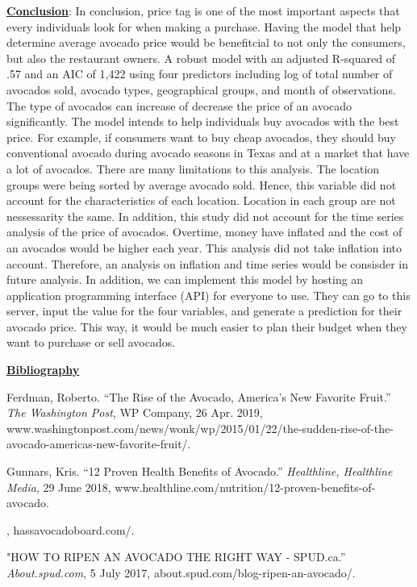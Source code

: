 \documentclass[11pt]{article}\usepackage[]{graphicx}\usepackage[]{color}
\begin{document}
\noindent\textbf{\underline{Conclusion}}: In conclusion, price tag is one of the most important aspects that every individuals look for when making a purchase. Having the model that help determine average avocado price would be benefitcial to not only the consumers, but also the restaurant owners. A robust model with an adjusted R-squared of .57 and an AIC of 1,422 using four predictors including log of total number of avocados sold, avocado types, geographical groups, and month of observations. The type of avocados can increase of decrease the price of an avocado significantly. The model intends to help individuals buy avocados with the best price. For example, if consumers want to buy cheap avocados, they should buy conventional avocado during avocado seasons in Texas and at a market that have a lot of avocados. There are many limitations to this analysis. The location groups were being sorted by average avocado sold. Hence, this variable did not account for the characteristics of each location. Location in each group are not nessessarity the same. In addition, this study did not account for the time series analysis of the price of avocados. Overtime, money have inflated and the cost of an avocados would be higher each year. This analysis did not take inflation into account. Therefore, an analysis on inflation and time series would be consisder in future analysis. In addition, we can implement this model by hosting an application programming interface (API) for everyone to use. They can go to this server, input the value for the four variables, and generate a prediction for their avocado price. This way, it would be much easier to plan their budget when they want to purchase or sell avocados.      
\hfill \break


\clearpage
\noindent\textbf{\underline{Bibliography}}
\hfill \break

\noindent [1] Ferdman, Roberto. “The Rise of the Avocado, America's New Favorite Fruit.” {\em The Washington Post}, WP Company, 26 Apr. 2019, www.washingtonpost.com/news/wonk/wp/2015/01/22/the-sudden-rise-of-the-avocado-americas-new-favorite-fruit/. 

\noindent [2] Gunnars, Kris. “12 Proven Health Benefits of Avocado.” {\em Healthline, Healthline Media}, 29 June 2018, www.healthline.com/nutrition/12-proven-benefits-of-avocado. 

, hassavocadoboard.com/. 

\noindent [4] "HOW TO RIPEN AN AVOCADO THE RIGHT WAY - SPUD.ca.” {\em About.spud.com}, 5 July 2017, about.spud.com/blog-ripen-an-avocado/. 
\end{document}
